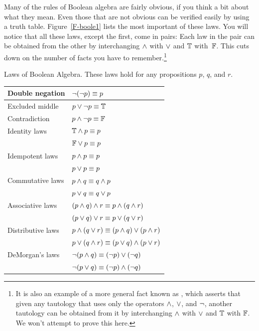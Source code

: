 Many of the rules of Boolean algebra are fairly obvious, if you think
a bit about what they mean.  Even those that are not obvious can
be verified easily by using a truth table.  Figure~\ref{F-boole1}
lists the most important of these laws.   You will
notice that all these laws, except the first, come in pairs:  Each 
law in the pair can be obtained from the other
by interchanging $\wedge$ with $\vee$ and $\mathbb{T}$ with~$\mathbb{F}$.  This cuts down
on the number of facts you have to remember.\footnote{It is also an
example of a more general fact known as , which asserts
that given any tautology that uses only
the operators $\wedge$, $\vee$, and $\lnot$, another tautology can be
obtained from it by interchanging $\wedge$ with $\vee$ and $\mathbb{T}$ with $\mathbb{F}$.
We won't attempt to prove this here.}


  {Laws of Boolean Algebra.  These laws hold for any
    propositions $p$, $q$, and $r$.}
  {\begin{tabular}{|l|l|}
      \hline
      \strut Double negation&   $\lnot(\lnot p)\equiv p$\\
      \hline
      \strut Excluded middle&   $p\vee\lnot p\equiv\mathbb{T}$\\
      \strut Contradiction&   $p\wedge\lnot p\equiv\mathbb{F}$\\
      \hline
      \strut Identity laws&          $\mathbb{T}\wedge p\equiv p$\\
      \strut&                        $\mathbb{F}\vee p \equiv p$\\
      \hline
      \strut Idempotent laws&    $p\wedge p\equiv p$\\
      \strut&                   $p\vee p\equiv p$\\
      \hline
      \strut Commutative laws&   $p\wedge q\equiv q\wedge p$\\
      \strut&                   $p\vee q\equiv q\vee p$\\
      \hline
      \strut Associative laws&   $(p\wedge q)\wedge r\equiv p\wedge(q\wedge r)$\\
      \strut&                   $(p\vee q)\vee r\equiv p\vee(q\vee r)$\\
      \hline
      \strut Distributive laws&  $p\wedge(q\vee r)\equiv (p\wedge q)\vee (p\wedge r)$\\
      \strut&                   $p\vee(q\wedge r)\equiv (p\vee q)\wedge (p\vee r)$\\
      \hline
      \strut DeMorgan's laws&    $\lnot(p\wedge q)\equiv (\lnot p)\vee(\lnot q)$\\
      \strut&                   $\lnot(p\vee q)\equiv (\lnot p)\wedge(\lnot q)$\\
      \hline
   \end{tabular}
  }

